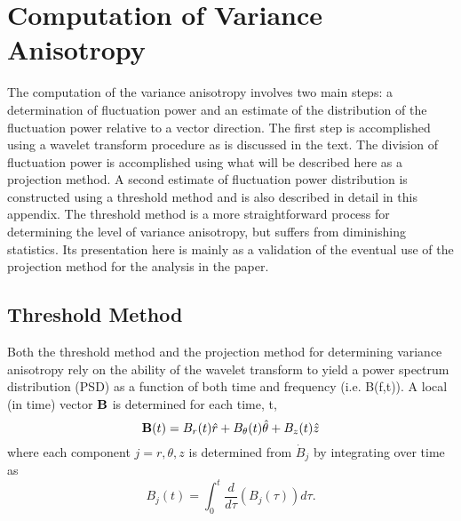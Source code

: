 \documentclass[preprint2]{aastex}
\begin{document}
\appendix

\section{Computation of Variance Anisotropy}\label{sec:projection}

The computation of the variance anisotropy involves two main steps: a determination of fluctuation power and an estimate of the distribution of the fluctuation power relative to a vector direction. The first step is accomplished using a wavelet transform procedure as is discussed in the text. The division of fluctuation power is accomplished using what will be described here as a projection method. A second estimate of fluctuation power distribution is constructed using a threshold method and is also described in detail in this appendix. The threshold method is a more straightforward process for determining the level of variance anisotropy, but suffers from diminishing statistics. Its presentation here is mainly as a validation of the eventual use of the projection method for the analysis in the paper. 

\subsection{Threshold Method}\label{sec:threshold}

Both the threshold method and the projection method for determining variance anisotropy rely on the ability of the wavelet transform to yield a power spectrum distribution (PSD) as a function of both time and frequency (i.e. B(f,t)). A local (in time) vector ${\bf B}$ is determined for each time, t,
\begin{equation}
{\bf B}(t) = B_{r}(t)\hat{r} + B_{\theta}(t)\hat{\theta} + B_{z}(t)\hat{z}
\label{eq:Bvector}
\end{equation}
where each component $j=r,\theta,z$ is determined from $\dot{B}_{j}$ by integrating over time as
\begin{equation}
B_{j}(t) = \int_{0}^{t} \frac{d}{d\tau}\left(B_{j}(\tau)\right) d\tau.
\label{eq:Bintegrated}
\end{equation}
\end{document}
